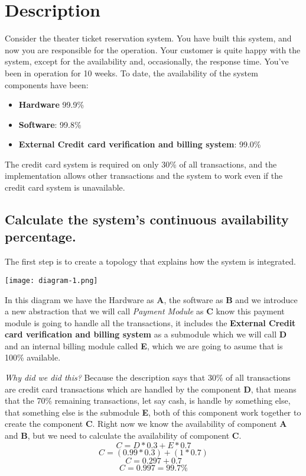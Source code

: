 \section{Description}
Consider the theater ticket reservation system.  You have built this system, 
and now you are responsible for the operation.  Your customer is quite happy 
with the system, except for the availability and, occasionally, the response 
time.  You’ve been in operation for 10 weeks.  To date, the availability of the
system components have been:
\begin{itemize}
    \item \textbf{Hardware} 99.9\%
    \item \textbf{Software}: 99.8\%
    \item \textbf{External Credit card verification and billing system}: 99.0\%
\end{itemize}

The credit card system is required on only 30\% of all transactions, and the 
implementation allows other transactions and the system to work even if the 
credit card system is unavailable.

\pagebreak

\subsection{Calculate the system’s continuous availability percentage.}
The first step is to create a topology that explains how the system is integrated.
\begin{center}
    \texttt{[image: diagram-1.png]}    
\end{center}
\noindent
In this diagram we have the Hardware as \textbf{A}, the software as \textbf{B} 
and we introduce a new abstraction that we will call \textit{Payment Module} as 
\textbf{C} know this payment module is going to handle all the transactions, it 
includes the \textbf{External Credit card verification and billing system} as a
submodule which we will call \textbf{D} and an internal billing module called 
\textbf{E}, which we are going to asume that is 100\% available. \newline\newline
\pagebreak

\noindent
\textit{Why did we did this?}\newline\newline
\noindent
Because the description says that 30\% of all transactions 
are credit card transactions which are handled by the component \textbf{D}, that 
means that the 70\% remaining transactions, let say cash, is handle by something 
else, that something else is the submodule \textbf{E}, both of this component 
work together to create the component \textbf{C}.\newline\newline
\noindent
Right now we know the availability of component \textbf{A} and \textbf{B}, but 
we need to calculate the availability of component \textbf{C}.
\[ C = D * 0.3 + E * 0.7 \]
\[ C = (0.99 * 0.3) + (1 * 0.7) \]
\[ C =  0.297 + 0.7 \]
\[ C =  0.997 = 99.7\% \]

